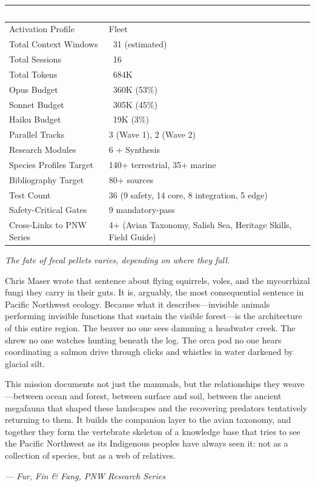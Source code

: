 \documentclass[11pt,letterpaper]{article}
\newcommand{\tableheader}[1]{\textbf{\sffamily\textcolor{white}{#1}}}
\begin{document}
\begin{center}
\begin{tabularx}{\textwidth}{L{5cm}X}
\toprule
{}
\tableheader{Metric} & \tableheader{Value} \\
\midrule
Activation Profile & Fleet \\
Total Context Windows & ~31 (estimated) \\
Total Sessions & ~16 \\
Total Tokens & ~684K \\
Opus Budget & ~360K (53\%) \\
Sonnet Budget & ~305K (45\%) \\
Haiku Budget & ~19K (3\%) \\
Parallel Tracks & 3 (Wave 1), 2 (Wave 2) \\
Research Modules & 6 + Synthesis \\
Species Profiles Target & 140+ terrestrial, 35+ marine \\
Bibliography Target & 80+ sources \\
Test Count & 36 (9 safety, 14 core, 8 integration, 5 edge) \\
Safety-Critical Gates & 9 mandatory-pass \\
Cross-Links to PNW Series & 4+ (Avian Taxonomy, Salish Sea, Heritage Skills, Field Guide) \\
\bottomrule
\end{tabularx}
\end{center}

\begin{quotebox}
\textit{The fate of fecal pellets varies, depending on where they fall.}

\vspace{0.5em}

Chris Maser wrote that sentence about flying squirrels, voles, and the mycorrhizal fungi they carry in their guts. It is, arguably, the most consequential sentence in Pacific Northwest ecology. Because what it describes---invisible animals performing invisible functions that sustain the visible forest---is the architecture of this entire region. The beaver no one sees damming a headwater creek. The shrew no one watches hunting beneath the log. The orca pod no one hears coordinating a salmon drive through clicks and whistles in water darkened by glacial silt.

This mission documents not just the mammals, but the relationships they weave---between ocean and forest, between surface and soil, between the ancient megafauna that shaped these landscapes and the recovering predators tentatively returning to them. It builds the companion layer to the avian taxonomy, and together they form the vertebrate skeleton of a knowledge base that tries to see the Pacific Northwest as its Indigenous peoples have always seen it: not as a collection of species, but as a web of relatives.

\vspace{0.5em}

\hfill\textit{--- Fur, Fin \& Fang, PNW Research Series}
\end{quotebox}
\end{document}

